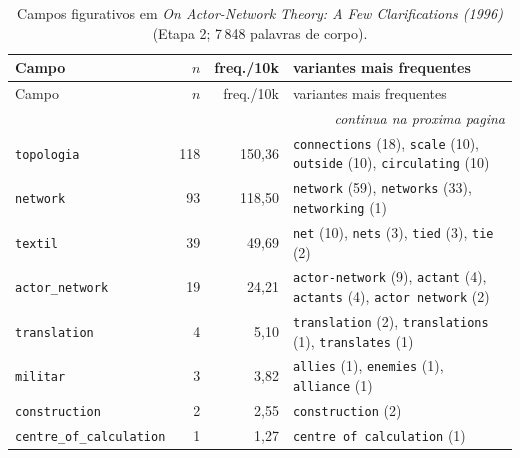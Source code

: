 {\footnotesize
\begin{longtable}{@{}l r r >{\raggedright\arraybackslash}p{6.4cm}@{}}
\caption{Campos figurativos em \emph{On Actor-Network Theory: A Few Clarifications (1996)} (Etapa 2; 7\,848 palavras de corpo).}\label{tab:campos-cla96}\\
\toprule
Campo & $n$ & freq./10k & variantes mais frequentes \\
\midrule \endfirsthead
\toprule Campo & $n$ & freq./10k & variantes mais frequentes \\ \midrule \endhead
\midrule \multicolumn{4}{r}{\footnotesize \emph{continua na proxima pagina}}\\ \endfoot
\bottomrule \endlastfoot
\texttt{topologia} & 118 & 150{,}36 & \texttt{connections} (18), \texttt{scale} (10), \texttt{outside} (10), \texttt{circulating} (10) \\
\texttt{network} & 93 & 118{,}50 & \texttt{network} (59), \texttt{networks} (33), \texttt{networking} (1) \\
\texttt{textil} & 39 & 49{,}69 & \texttt{net} (10), \texttt{nets} (3), \texttt{tied} (3), \texttt{tie} (2) \\
\texttt{actor\_network} & 19 & 24{,}21 & \texttt{actor-network} (9), \texttt{actant} (4), \texttt{actants} (4), \texttt{actor network} (2) \\
\texttt{translation} & 4 & 5{,}10 & \texttt{translation} (2), \texttt{translations} (1), \texttt{translates} (1) \\
\texttt{militar} & 3 & 3{,}82 & \texttt{allies} (1), \texttt{enemies} (1), \texttt{alliance} (1) \\
\texttt{construction} & 2 & 2{,}55 & \texttt{construction} (2) \\
\texttt{centre\_of\_calculation} & 1 & 1{,}27 & \texttt{centre of calculation} (1) \\
\end{longtable}}

